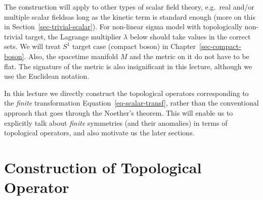 \documentclass[
  letterpaper,
  DIV=11,
  numbers=noendperiod]{scrreport}
\begin{document}
\begin{tcolorbox}[enhanced jigsaw, bottomtitle=1mm, colback=white, toprule=.15mm, coltitle=black, opacityback=0, toptitle=1mm, arc=.35mm, left=2mm, title=\textcolor{quarto-callout-note-color}{\faInfo}\hspace{0.5em}{\textsf{Note}}, rightrule=.15mm, titlerule=0mm, leftrule=.75mm, colbacktitle=quarto-callout-note-color!10!white, opacitybacktitle=0.6, breakable, bottomrule=.15mm, colframe=quarto-callout-note-color-frame]

The construction will apply to other types of scalar field theory,
e.g.~real and/or multiple scalar fieldsas long as the kinetic term is
standard enough (more on this in Section~\ref{sec-trivial-scalar}). For
non-linear sigma model with topologically non-trivial target, the
Lagrange multiplier \(\lambda\) below should take values in the correct
sets. We will treat \(S^1\) target case (compact boson) in
Chapter~\ref{sec-compact-boson}. Also, the spacetime manifold \(M\) and
the metric on it do not have to be flat. The signature of the metric is
also insignificant in this lecture, although we use the Euclidean
notation.

\end{tcolorbox}

\begin{tcolorbox}[enhanced jigsaw, bottomtitle=1mm, colback=white, toprule=.15mm, coltitle=black, opacityback=0, toptitle=1mm, arc=.35mm, left=2mm, title=\textcolor{quarto-callout-note-color}{\faInfo}\hspace{0.5em}{\textsf{Note}}, rightrule=.15mm, titlerule=0mm, leftrule=.75mm, colbacktitle=quarto-callout-note-color!10!white, opacitybacktitle=0.6, breakable, bottomrule=.15mm, colframe=quarto-callout-note-color-frame]

In this lecture we directly construct the topological operators
corresponding to the \emph{finite} transformation
Equation~\ref{eq-scalar-transf}, rather than the conventional approach
that goes through the Noether's theorem. This will enable us to
explicitly talk about \emph{finite} symmetries (and their anomalies) in
terms of topological operators, and also motivate us the later sections.

\end{tcolorbox}

\hypertarget{construction-of-topological-operator}{%
\section{Construction of Topological
Operator}\label{construction-of-topological-operator}}
\end{document}
